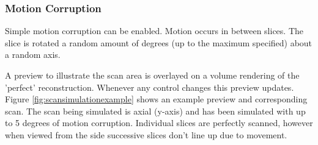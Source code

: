 \subsubsection*{Motion Corruption}
Simple motion corruption can be enabled. Motion occurs in between slices. The slice is rotated a random amount of degrees (up to the maximum specified) about a random axis.

\clearpage
A preview to illustrate the scan area is overlayed on a volume rendering of the 'perfect' reconstruction. Whenever any control changes this preview updates. Figure \ref{fig:scansimulationexample} shows an example preview and corresponding scan. The scan being simulated is axial (y-axis) and has been simulated with up to 5 degrees of motion corruption. Individual slices are perfectly scanned, however when viewed from the side successive slices don't line up due to movement.

